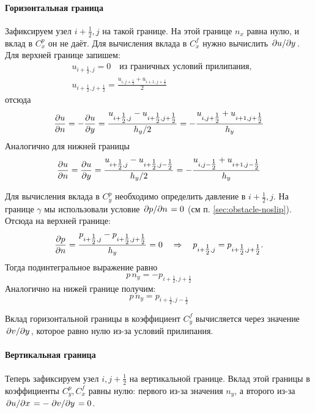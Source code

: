 \paragraph{Горизонтальная граница} Зафиксируем узел $i+\tfrac12, j$ на такой границе.
На этой границе $n_x$ равна нулю, и вклад в $C^p_x$ он не даёт.
Для вычисления вклада в $C^f_x$ нужно вычислить $\left.\partial u\middle/\partial y\right.$.
Для верхней границе запишем:
\begin{align*}
&u_{i+\tfrac12, j} = 0 \quad \text{из граничных условий прилипания},\\
&u_{i+\tfrac12, j + \tfrac12} = \frac{u_{i, j+\tfrac12} + u_{i+1, j + \tfrac12}}{2}
\end{align*}
отсюда
\begin{equation}
\label{eq:ns2d_dudn_upper}
\frac{\partial u}{\partial n} =
-\frac{\partial u}{\partial y} = \frac{u_{i+\tfrac12, j} - u_{i+\tfrac12, j+\tfrac12}}{h_y/2} =
              -\frac{u_{i, j+\tfrac12} + u_{i+1, j + \tfrac12}}{h_y}
\end{equation}
Аналогично для нижней границы
\begin{equation}
\label{eq:ns2d_dudn_lower}
\frac{\partial u}{\partial n} =
\frac{\partial u}{\partial y} =
\frac{u_{i+\tfrac12, j} - u_{i+\tfrac12, j-\tfrac12}}{h_y/2} =
-\frac{u_{i, j-\tfrac12} + u_{i+1, j - \tfrac12}}{h_y}
\end{equation}

Для вычисления вклада в $C_y^p$ необходимо определить давление в $i+\tfrac12, j$.
На границе $\gamma$ мы использовали условие $\left.\partial p\middle/\partial n\right. = 0$ (см п. \ref{sec:obstacle-noslip}).
Отсюда на верхней границе:
\begin{equation*}
\frac{\partial p}{\partial n} = \frac{p_{i+\tfrac12, j} - p_{i+\tfrac12, j+\tfrac12}}{h_y} = 0
\quad\Rightarrow\quad p_{i+\tfrac12, j} = p_{i+\tfrac12, j+\tfrac12}.
\end{equation*}
Тогда подинтегральное выражение равно
\begin{equation}
\label{eq:ns2d_obstacle_pny_top}
p\,n_y = -p_{i+\tfrac12, j+\tfrac12}
\end{equation}
Аналогично на нижей границе получим:
\begin{equation}
\label{eq:ns2d_obstacle_pny_bot}
p\,n_y = p_{i+\tfrac12, j-\tfrac12}
\end{equation}

Вклад горизонтальной границы в коэффициент $C^f_y$
вычисляется через значение $\left.\partial v\middle/\partial y\right.$, которое равно нулю из-за условий прилипания.

\paragraph{Вертикальная граница}
Теперь зафиксируем узел $i, j+\tfrac12$ на вертикальной границе.
Вклад этой границы в коэффициенты $C^p_y, C^f_x$ равны нулю:
первого из-за значения $n_y$, а второго из-за $\left.\partial u\middle/\partial x\right. = -\left.\partial v\middle/\partial y\right. = 0$.

